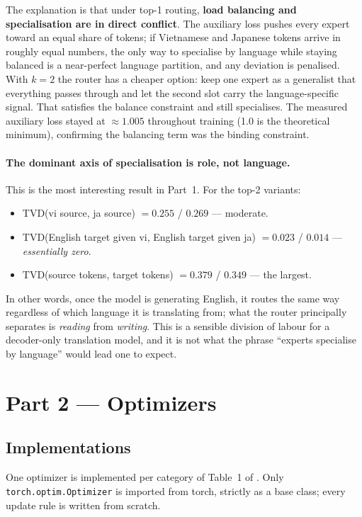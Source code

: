 \documentclass[11pt]{article}
\begin{document}
The explanation is that under top-1 routing, \textbf{load balancing and
specialisation are in direct conflict}. The auxiliary loss pushes every expert
toward an equal share of tokens; if Vietnamese and Japanese tokens arrive in
roughly equal numbers, the only way to specialise by language while staying
balanced is a near-perfect language partition, and any deviation is penalised.
With $k{=}2$ the router has a cheaper option: keep one expert as a generalist
that everything passes through and let the second slot carry the
language-specific signal. That satisfies the balance constraint and still
specialises. The measured auxiliary loss stayed at $\approx 1.005$ throughout
training (1.0 is the theoretical minimum), confirming the balancing term was the
binding constraint.

\paragraph{The dominant axis of specialisation is role, not language.} This is
the most interesting result in Part~1. For the top-2 variants:
\begin{itemize}
  \item TVD(vi source, ja source) $= 0.255$ / $0.269$ --- moderate.
  \item TVD(English target given vi, English target given ja) $= 0.023$ / $0.014$
        --- \emph{essentially zero}.
  \item TVD(source tokens, target tokens) $= 0.379$ / $0.349$ --- the largest.
\end{itemize}
In other words, once the model is generating English, it routes the same way
regardless of which language it is translating from; what the router principally
separates is \emph{reading} from \emph{writing}. This is a sensible division of
labour for a decoder-only translation model, and it is not what the phrase
``experts specialise by language'' would lead one to expect.

\section{Part 2 --- Optimizers}

\subsection{Implementations}

One optimizer is implemented per category of Table~1 of
\citet{wen2025fantastic}. Only
\texttt{torch.optim.\allowbreak Optimizer} is imported from torch, strictly as
a base class;
every update rule is written from scratch.
\end{document}

